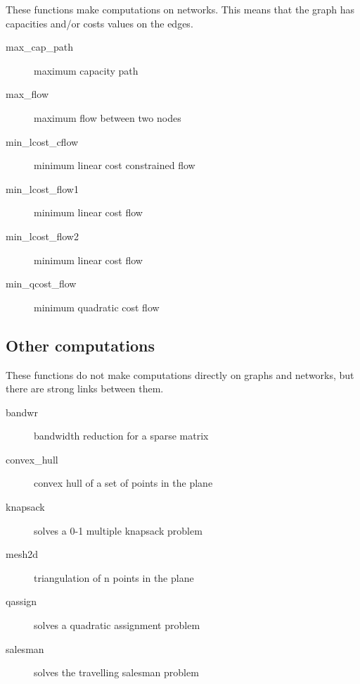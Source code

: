 \documentclass[11pt]{article}
\begin{document}
These functions make computations on networks. This means that the
graph has capacities and/or costs values on the edges.

\begin{description}
\item[max\_cap\_path] maximum capacity path
\item[max\_flow] maximum flow between two nodes
\item[min\_lcost\_cflow] minimum linear cost constrained flow
\item[min\_lcost\_flow1] minimum linear cost flow
\item[min\_lcost\_flow2] minimum linear cost flow
\item[min\_qcost\_flow] minimum quadratic cost flow
\end{description}

\subsection{Other computations}

These functions do not make computations directly on graphs and
networks, but there are strong links between them.

\begin{description}
\item[bandwr] bandwidth reduction for a sparse matrix
\item[convex\_hull] convex hull of a set of points in the plane
\item[knapsack] solves a 0-1 multiple knapsack problem
\item[mesh2d] triangulation of n points in the plane
\item[qassign] solves a quadratic assignment problem
\item[salesman] solves the travelling salesman problem
\end{description}

\newpage

\tableofcontents

\listoffigures


\end{document}
